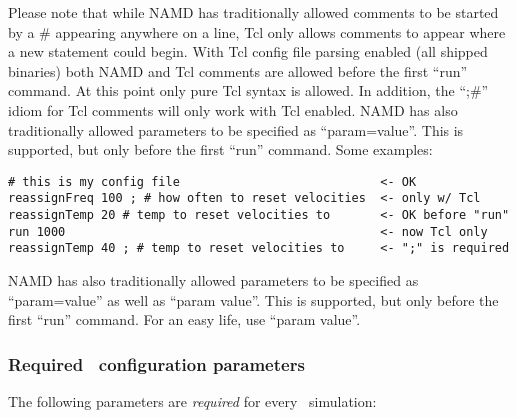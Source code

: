 Please note that while NAMD has traditionally allowed comments to be
started by a \# appearing anywhere on a line, Tcl only allows comments
to appear where a new statement could begin.  With Tcl config file
parsing enabled (all shipped binaries) both NAMD and Tcl comments are
allowed before the first ``run'' command.  At this point only pure Tcl
syntax is allowed.  In addition, the ``;\#'' idiom for Tcl comments will
only work with Tcl enabled.  NAMD has also traditionally allowed
parameters to be specified as ``param=value''.  This is supported, but
only before the first ``run'' command.  Some examples:

\begin{verbatim}
# this is my config file                            <- OK
reassignFreq 100 ; # how often to reset velocities  <- only w/ Tcl
reassignTemp 20 # temp to reset velocities to       <- OK before "run"
run 1000                                            <- now Tcl only
reassignTemp 40 ; # temp to reset velocities to     <- ";" is required
\end{verbatim}

NAMD has also traditionally allowed parameters to be specified as
``param=value'' as well as ``param value''.  This is supported, but only
before the first ``run'' command.  For an easy life, use ``param value''.

\subsubsection{Required \NAMD\ configuration parameters}
\label{section:requiredparams}

The following parameters are {\em required} for every
\NAMD\ simulation:

